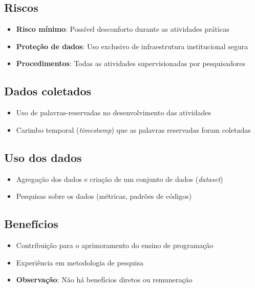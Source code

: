\documentclass[12pt,a4paper]{article}
\begin{document}
	\subsection{Riscos}
	\begin{itemize}
		\item \textbf{Risco mínimo}: Possível desconforto durante as atividades práticas
		\item \textbf{Proteção de dados}: Uso exclusivo de infraestrutura institucional segura
		\item \textbf{Procedimentos}: Todas as atividades supervisionadas por pesquisadores
	\end{itemize}
	
	\subsection{Dados coletados}
	\begin{itemize}
		\item Uso de palavras-reservadas no desenvolvimento das atividades
		\item Carimbo temporal (\textit{timestamp}) que as palavras reservadas foram coletadas
	\end{itemize}
	
	\subsection{Uso dos dados}
	\begin{itemize}
		\item Agregação dos dados e criação de um conjunto de dados (\textit{dataset})
		\item Pesquisas sobre os dados (métricas, padrões de códigos)
	\end{itemize}
%	
	\subsection{Benefícios}
	\begin{itemize}
		\item Contribuição para o aprimoramento do ensino de programação
		\item Experiência em metodologia de pesquisa
		\item \textbf{Observação}: Não há benefícios diretos ou remuneração
	\end{itemize}
	
\end{document}
